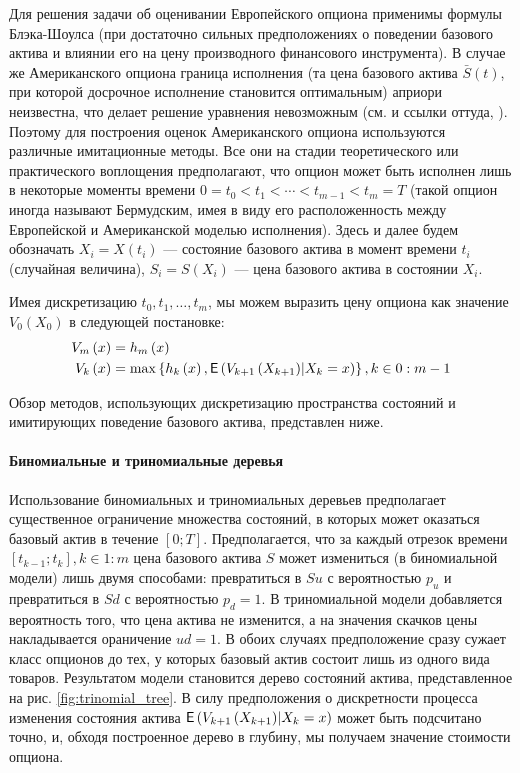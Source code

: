 Для решения задачи об оценивании Европейского опциона применимы формулы Блэка-Шоулса (при достаточно сильных предположениях о поведении базового актива и влиянии его на цену производного финансового инструмента). В случае же Американского опциона граница исполнения (та цена базового актива $\bar{S}(t)$, при которой досрочное исполнение становится оптимальным) априори неизвестна, что делает решение уравнения невозможным (см. \cite{Lyuu2007} и ссылки оттуда, \cite{Peskir2006}). Поэтому для построения оценок Американского опциона используются различные имитационные методы. Все они на стадии теоретического или практического воплощения предполагают, что опцион может быть исполнен лишь в некоторые моменты времени $0 = t_0 < t_1 < \cdots < t_{m-1} < t_m=T$ (такой опцион иногда называют Бермудским, имея в виду его расположенность между Европейской и Американской моделью исполнения). Здесь и далее будем обозначать $X_i = X\left(t_i\right)$ --- состояние базового актива в момент времени $t_i$ (случайная величина), $S_i = S\left(X_i\right)$ --- цена базового актива в состоянии $X_i$.

Имея дискретизацию $t_0, t_1, \ldots, t_m$, мы можем выразить цену опциона как значение $V_0\left(X_0\right)$ в следующей постановке:
\begin{equation}\label{eq:common_recursive_statement}
	\begin{aligned}
		V_m\left(x\right) &= h_m\left(x\right) \\
		V_k\left(x\right) &= \max\left\lbrace h_k\left(x\right), \mathsf{E}\left(V_{k+1}\left(X_{k+1}\right)\middle\vert X_k = x\right)\right\rbrace, k\in 0:m-1
	\end{aligned}
\end{equation}

Обзор методов, использующих дискретизацию пространства состояний и имитирующих поведение базового актива, представлен ниже.

\paragraph{Биномиальные и триномиальные деревья}
Использование биномиальных и триномиальных деревьев предполагает существенное ограничение множества состояний, в которых может оказаться базовый актив в течение $[0;T]$. Предполагается, что за каждый отрезок времени $\left[t_{k-1};t_k\right], k\in 1:m$ цена базового актива $S$ может измениться (в биномиальной модели) лишь двумя способами: превратиться в $Su$ с вероятностью $p_u$ и превратиться в $Sd$ с вероятностью $p_d=1$. В триномиальной модели добавляется вероятность того, что цена актива не изменится, а на значения скачков цены накладывается ораничение $ud = 1$. В обоих случаях предположение сразу сужает класс опционов до тех, у которых базовый актив состоит лишь из одного вида товаров. Результатом модели становится дерево состояний актива, представленное на рис. \ref{fig:trinomial_tree}. В силу предположения о дискретности процесса изменения состояния актива $\mathsf{E}\left(V_{k+1}\left(X_{k+1}\right)\middle\vert X_k = x\right)$ может быть подсчитано точно, и, обходя построенное дерево в глубину, мы получаем значение стоимости опциона.

